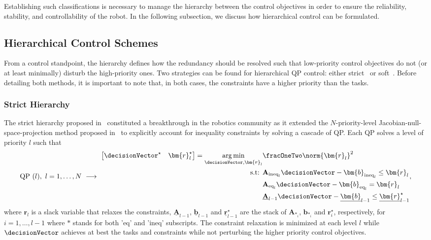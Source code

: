 Establishing such classifications is necessary to manage the hierarchy between the control objectives in order to ensure the reliability, stability, and controllability of the robot. In the following subsection, we discuss how hierarchical control can be formulated.
\subsection{Hierarchical Control Schemes}
 From a control standpoint, the hierarchy defines how the redundancy should be resolved such that low-priority control objectives do not (or at least minimally) disturb the high-priority ones. Two strategies can be found for hierarchical QP control: either strict~\cite{kanoun2011tro} or soft~\cite{salini2011icra}. Before detailing both methods, it is important to note that, in both cases, the constraints have a higher priority than the tasks.
 \subsubsection{Strict Hierarchy}
The strict hierarchy proposed in~\cite{kanoun2011tro} constituted a breakthrough in the robotics community as it extended the $N$-priority-level Jacobian-null-space-projection method proposed in~\cite{siciliano1991icar} to explicitly account for inequality constraints by solving a cascade of QP. Each QP solves a level of priority $l$ such that %
\begin{align}\label{eq-chap0:strict-hierarchical QP}
	\text{QP}~(l), \ l=1,\ldots, N \ \longrightarrow \  
	\begin{split}
		 \begin{bmatrix}
		 	\decisionVector^{\star}&\bm{r}^{\star}_l
		 \end{bmatrix} = \underset{\decisionVector,\bm{r}_l}{\arg\min} &\fracOneTwo\norm{\bm{r}_l}^2 \\
		\text{s.t: } & \mathbf{A}_{{\rm ineq}_l}\decisionVector-\bm{b}_{{\rm ineq}_l}\leq \bm{r}_l \\ 
		& \mathbf{A}_{{\rm eq}_l}\decisionVector-\bm{b}_{{\rm eq}_l}= \bm{r}_l \\ 
		& \underline{\mathbf{A}}_{l-1}\decisionVector - \underline{\bm{b}}_{l-1} \leq \underline{\bm{r}}^{\star}_{l-1}
	\end{split},
\end{align}
where $\bm{r}_l$ is a slack variable that relaxes the constraints, $\underline{\mathbf{A}}_{l-1}$, $\underline{\bm{b}}_{l-1}$ and $\underline{\bm{r}}^{\star}_{l-1}$  are the stack of $\mathbf{A}_{{*}_i}$,  $\bm{b}_{{*}_i}$ and $\bm{r}^{\star}_i$, respectively,  for $i=1,\ldots,l-1$ where $*$ stands for both 'eq' and 'ineq' subscripts. The constraint relaxation is minimized at each level $l$ while $\decisionVector$ achieves at best the tasks and constraints while not perturbing the higher priority control objectives.  

